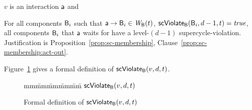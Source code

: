  \en

\item $v$ is an interaction $\mathsf{a}$ and
   \bn

   \item \label{def:supercycle.violation.interaction.out}
         For all components $\mathsf{B}_i$ such that $\mathsf{a} \rightarrow \mathsf{B}_i \in \mathit{W}_{\mathsf{B}}({t})$, $\mathsf{scViolate}_{\mathsf{B}}(\mathsf{B}_i,d-1,t) = \mathit{true}$,
         \ie all components $\mathsf{B}_i$ that $\mathsf{a}$ waits for have a level-$(d-1)$ supercycle-violation.
    Justification is Proposition~\ref{prop:sc-membership}, Clause~\ref{prop:sc-membership:act-out}.


   \en

\en

Figure~\ref{fig:scViolate} gives a formal definition of $\mathsf{scViolate}_{\mathsf{B}}(v,d,t)$.
\ed


\begin{figure}[ht]

\setcounter{lctr}{0}
\begin{tabbing}\label{alg:check-scViol}
mm\= mm\= mm\= mm\= mm\=\kill
$\mathsf{scViolate}_{\mathsf{B}}(v,d,t)$\\
   \lit{\FI}
\lio{\FI}


   \lit{\ELSE\ \RETURNE{\fff}}
   \lit{\FI}
\lio{\FI}

   \lit{\RETURNE{\fff}}
\lio{\FI}
\end{tabbing}

\caption{Formal definition of $\mathsf{scViolate}_{\mathsf{B}}(v,d,t)$}
\label{fig:scViolate}
\end{figure}


